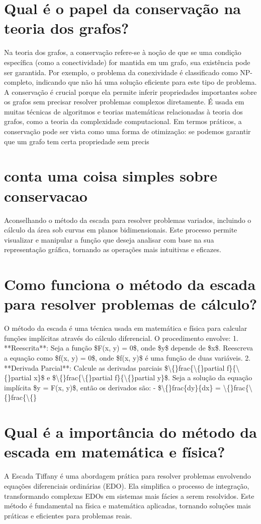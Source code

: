 \documentclass[11pt,a4paper]{article}
\begin{document}
\section{Qual é o papel da conservação na teoria dos grafos?}
Na teoria dos grafos, a conservação refere-se à noção de que se uma condição específica (como a conectividade) for mantida em um grafo, sua existência pode ser garantida. Por exemplo, o problema da conexividade é classificado como NP-completo, indicando que não há uma solução eficiente para este tipo de problema. A conservação é crucial porque ela permite inferir propriedades importantes sobre os grafos sem precisar resolver problemas complexos diretamente. É usada em muitas técnicas de algoritmos e teorias matemáticas relacionadas à teoria dos grafos, como a teoria da complexidade computacional. Em termos práticos, a conservação pode ser vista como uma forma de otimização: se podemos garantir que um grafo tem certa propriedade sem precis

\section{conta uma coisa simples sobre conservacao}
Aconselhando o método da escada para resolver problemas variados, incluindo o cálculo da área sob curvas em planos bidimensionais. Este processo permite visualizar e manipular a função que deseja analisar com base na sua representação gráfica, tornando as operações mais intuitivas e eficazes.

\section{Como funciona o método da escada para resolver problemas de cálculo?}
O método da escada é uma técnica usada em matemática e física para calcular funções implícitas através do cálculo diferencial. O procedimento envolve: 1. **Reescrita**: Seja a função \$F(x, y) = 0\$, onde \$y\$ depende de \$x\$. Reescreva a equação como \$f(x, y) = 0\$, onde \$f(x, y)\$ é uma função de duas variáveis. 2. **Derivada Parcial**: Calcule as derivadas parciais \$\textbackslash\{\}frac\{\textbackslash\{\}partial f\}\{\textbackslash\{\}partial x\}\$ e \$\textbackslash\{\}frac\{\textbackslash\{\}partial f\}\{\textbackslash\{\}partial y\}\$. Seja a solução da equação implícita \$y = F(x, y)\$, então os derivados são: - \$\textbackslash\{\}frac\{dy\}\{dx\} = \textbackslash\{\}frac\{\textbackslash\{\}frac\{\textbackslash\{\}

\section{Qual é a importância do método da escada em matemática e física?}
A Escada Tiffany é uma abordagem prática para resolver problemas envolvendo equações diferenciais ordinárias (EDO). Ela simplifica o processo de integração, transformando complexas EDOs em sistemas mais fácies a serem resolvidos. Este método é fundamental na física e matemática aplicadas, tornando soluções mais práticas e eficientes para problemas reais.
\end{document}
